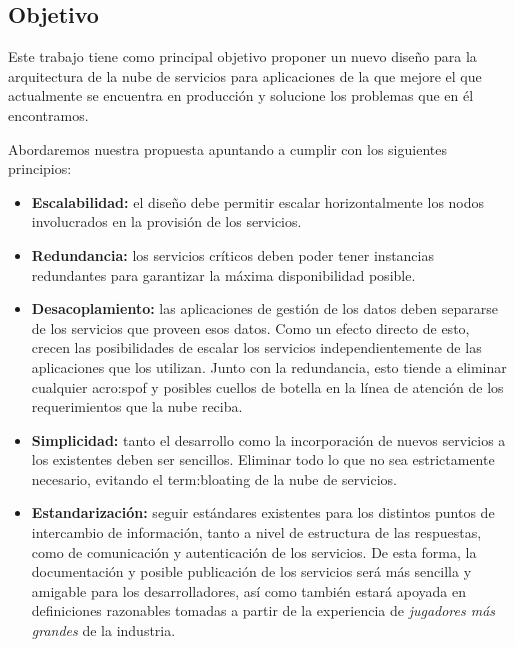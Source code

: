 \subsection{Objetivo}
\label{objetivo}

Este trabajo tiene como principal objetivo proponer un nuevo diseño para la arquitectura de la nube de servicios para aplicaciones de la \unlp que mejore el que actualmente se encuentra en producción y solucione los problemas que en él encontramos.

Abordaremos nuestra propuesta apuntando a cumplir con los siguientes principios:

\begin{itemize}
  \item \textbf{Escalabilidad:} el diseño debe permitir escalar horizontalmente los nodos involucrados en la provisión de los servicios.

  \item \textbf{Redundancia:} los servicios críticos deben poder tener instancias redundantes para garantizar la máxima disponibilidad posible.

  \item \textbf{Desacoplamiento:} las aplicaciones de gestión de los datos deben separarse de los servicios que proveen esos datos. Como un efecto directo de esto, crecen las posibilidades de escalar los servicios independientemente de las aplicaciones que los utilizan. Junto con la redundancia, esto tiende a eliminar cualquier \gls{acro:spof} y posibles cuellos de botella en la línea de atención de los requerimientos que la nube reciba.

  \item \textbf{Simplicidad:} tanto el desarrollo como la incorporación de nuevos servicios a los existentes deben ser sencillos. Eliminar todo lo que no sea estrictamente necesario, evitando el \gls{term:bloating} de la nube de servicios.

  \item \textbf{Estandarización:} seguir estándares existentes para los distintos puntos de intercambio de información, tanto a nivel de estructura de las respuestas, como de comunicación y autenticación de los servicios. De esta forma, la documentación y posible publicación de los servicios será más sencilla y amigable para los desarrolladores, así como también estará apoyada en definiciones razonables tomadas a partir de la experiencia de \textit{jugadores más grandes} de la industria.
\end{itemize}
